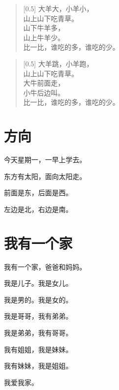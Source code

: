 \documentclass[12pt,UTF-8,openany]{ctexbook}
\begin{document}
\begin{large}
    
    \begin{verse}[0.5\linewidth]
        大羊大，小羊小， \\
        山上山下吃青草。 \\
        山下牛羊多， \\
        山上牛羊少。 \\
        比一比，谁吃的多，谁吃的少。
    \end{verse}
    
    
    \begin{verse}[0.5\linewidth]
        大羊跳，小羊跑， \\
        山上山下吃青草。 \\
        大牛前面走， \\
        小牛后边叫。 \\
        比一比，谁吃的多，谁吃的少。
    \end{verse}
    
\end{large}





\chapter{方向}

\begin{large}
    
    今天星期一，一早上学去。
    
    东方有太阳，面向太阳走。
    
    前面是东，后面是西。
    
    左边是北，右边是南。
    
\end{large}





\chapter{我有一个家}

\begin{large}
    
    我有一个家，爸爸和妈妈。
    
    我是儿子。我是女儿。
    
    我是男的。我是女的。
    
    我是哥哥，我有弟弟。
    
    我是弟弟，我有哥哥。
    
    我有姐姐，我是妹妹。
    
    我有妹妹，我是姐姐。
    
    我爱我家。
    
\end{large}
\end{document}
